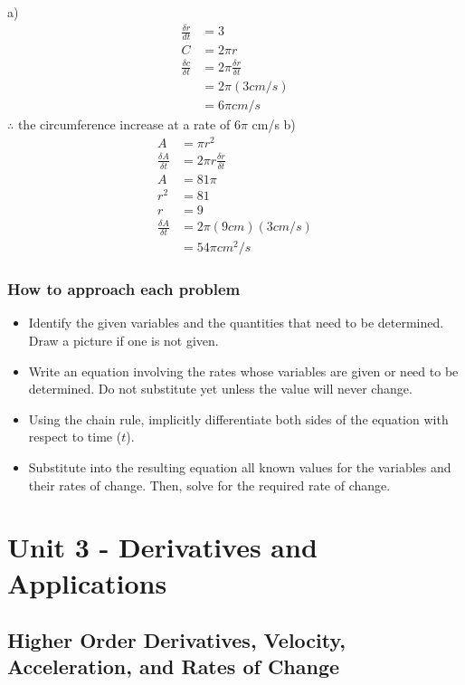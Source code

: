 \documentclass{article}
\begin{document}
a) 
\begin{align*}
    \frac{\delta r}{dt}&=3\\
    C&=2\pi r\\
    \frac{\delta c }{\delta t}&=2 \pi \frac{\delta r}{\delta t}\\
    &=2 \pi (3cm/s)\\
    &=6 \pi cm/s 
\end{align*}
$\therefore$ the circumference increase at a rate of $6 \pi$ cm/s
b) 
\begin{align*}
    A&=\pi r^2\\
    \frac{\delta A}{\delta t} &=2\pi r \frac{\delta r}{\delta t}\\
    A&=81 \pi \\
    r^2&=81\\
    r&=9\\
    \frac{\delta A}{\delta t}&=2\pi (9 cm)(3cm/s)\\
    &=54\pi cm^2/s
\end{align*}

 
\subsubsection{How to approach each problem}
\begin{itemize}
    \item Identify the given variables and the quantities that need to be determined. Draw a picture if one is not given.

    \item Write an equation involving the rates whose variables are given or need to be determined. Do not substitute yet unless the value will never change.

    \item Using the chain rule, implicitly differentiate both sides of the equation with respect to time ($t$).

    \item Substitute into the resulting equation all known values for the variables and their rates of change. Then, solve for the required rate of change.	
\end{itemize}

\section{Unit 3 - Derivatives and Applications }
\subsection{Higher Order Derivatives, Velocity, Acceleration, and Rates of Change}
\end{document}
